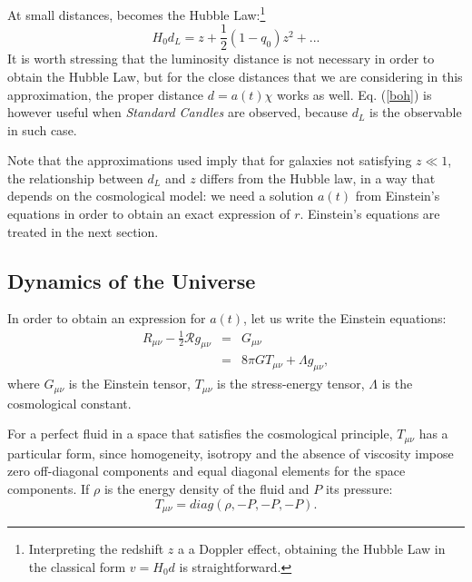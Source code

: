 At small distances,  becomes the Hubble Law:\footnote{Interpreting the redshift $z$ a a Doppler effect, obtaining the Hubble Law in the classical form $v=H_0 d$ is straightforward.}
\begin{equation}
H_0 d_L = z + \frac {1}{2} (1-q_0)z^2 + ...\label{boh}
\end{equation}
It is worth stressing that the luminosity distance is not necessary in order to obtain the Hubble Law, but for the close distances that we are considering in this approximation, the proper distance $d = a(t)\chi$ works as well. Eq. (\ref{boh}) is however useful when \emph{Standard Candles} are observed, because $d_L$ is the observable in such case.

Note that the approximations used imply that for galaxies not satisfying $z \ll 1$, the relationship between $d_L$ and $z$ differs from the Hubble law, in a way that depends on the cosmological model: we need a solution $a(t)$ from Einstein's equations in order to obtain an exact expression of $r$. Einstein's equations are treated in the next section.

\subsection{Dynamics of the Universe}
In order to obtain an expression for $a(t)$, let us write the Einstein equations:
\begin{eqnarray}
R_{\mu \nu} - \frac{1}{2} \mathcal{R} g_{\mu \nu} & = & G_{\mu \nu} \\
& = & 8 \pi G T_{\mu \nu} + \Lambda g_{\mu \nu}, \label{einstein}
\end{eqnarray}where  $G_{\mu \nu}$  is the Einstein tensor, $T_{\mu \nu}$ is the stress-energy tensor, $\Lambda$ is the cosmological constant. 

For a perfect fluid in a space that satisfies the cosmological principle, $T_{\mu \nu}$ has a particular form, since homogeneity, isotropy and the absence of viscosity impose zero off-diagonal components and equal diagonal elements for the space components. If $\rho$ is the energy density of the fluid and $P$ its pressure:
\begin{equation}
T_{\mu \nu} = diag (\rho, -P, -P, -P). \label{tmunu}
\end{equation}

